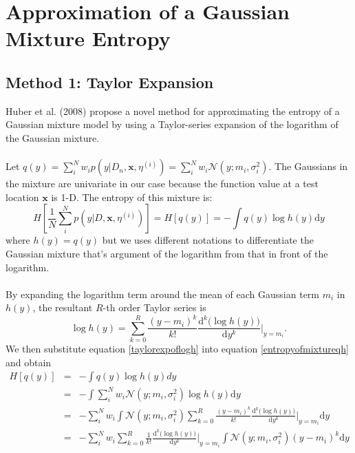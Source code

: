 \documentclass[a4paper,11pt]{report}
\begin{document}
\section{Approximation of a Gaussian Mixture Entropy} \label{approxHGMM}

\subsection{Method 1: Taylor Expansion}

Huber et al. (2008) \cite{huber2008entropy}  propose a novel method for approximating the entropy of a Gaussian mixture model by using a Taylor-series expansion of the logarithm of the Gaussian mixture.
\\\\ \noindent
Let $ q (y)= \sum_i^{N} w_i  p(y \vert D_n,\mathbf{x},\eta^{(i)}) = \sum_i^{N} w_i  \mathcal{N}(y; m_i, \sigma_i^2)$. The Gaussians in the mixture are univariate in our case because the function value at a test location $\mathbf{x}$ is 1-D. The entropy of this mixture is: 
 	\begin{equation} \label{entropyofmixtureqh}
	H \left[ \frac{1}{N}  \sum_i^{N} p(y \vert D,\mathbf{x},\eta^{(i)}) \right] =H \left[ q(y) \right] = - \int q(y) \log h (y) \mathrm{d} y 
	\end {equation}
where $h(y)=q(y)$ but we uses different notations to differentiate the Gaussian mixture that's argument of the logarithm from that in front of the logarithm. 
\\\\
By expanding the logarithm term around the mean of each Gaussian term $m_i $ in $h(y)$, the resultant $R$-th order Taylor series is
	\begin{equation} \label{taylorexpoflogh}
	\log h (y) = \sum_{k=0} ^{R} \frac{(y - m_i)^k}{k !} \frac{\mathrm{d}^{k} \big(\log h(y) \big)} {\mathrm{d} y^k}\bigg \rvert_{y=m_i}.
	\end {equation}
We then substitute equation \ref{taylorexpoflogh} into equation \ref{entropyofmixtureqh} and obtain
  	\begin{eqnarray*} 
	H \left[ q(y) \right] &=& - \int q(y) \log h (y) dy 
	\\&=& - \int \sum_i^{N} w_i  \mathcal{N}(y; m_i, \sigma_i^2) \log h (y) \mathrm{d} y
	\\&=& -  \sum_i^{N} w_i  \int  \mathcal{N}(y; m_i, \sigma_i^2) \sum_{k=0} ^{R} \frac{(y - m_i)^k}{k !} \frac{\mathrm{d}^{k} \big(\log h(y) \big)} {\mathrm{d} y^k}\bigg \rvert_{y=m_i}   \mathrm{d} y
	\\&=& -  \sum_i^{N} w_i  \sum_{k=0} ^{R} \frac{1}{k ! }  \frac{\mathrm{d}^{k} \big(\log h(y) \big)} {\mathrm{d} y^k}\bigg \rvert_{y=m_i}  \int  \mathcal{N}(y; m_i, \sigma_i^2) (y-m_i)^k \mathrm{d} y
	\end {eqnarray*}
\end{document}
